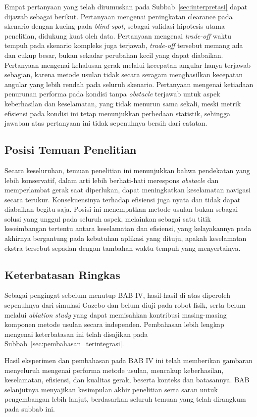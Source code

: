 Empat pertanyaan yang telah dirumuskan pada Subbab~\ref{sec:interpretasi}
dapat dijawab sebagai berikut. Pertanyaan mengenai peningkatan clearance
pada skenario dengan kucing pada \textit{blind-spot}, sebagai validasi
hipotesis utama penelitian, didukung kuat oleh data. Pertanyaan mengenai
\textit{trade-off} waktu tempuh pada skenario kompleks juga terjawab,
\textit{trade-off} tersebut memang ada dan cukup besar, bukan sekadar
perubahan kecil yang dapat diabaikan. Pertanyaan mengenai kehalusan gerak
melalui kecepatan angular hanya terjawab sebagian, karena metode usulan
tidak secara seragam menghasilkan kecepatan angular yang lebih rendah pada
seluruh skenario. Pertanyaan mengenai ketiadaan penurunan performa pada
kondisi tanpa \textit{obstacle} terjawab untuk aspek keberhasilan dan
keselamatan, yang tidak menurun sama sekali, meski metrik efisiensi pada
kondisi ini tetap menunjukkan perbedaan statistik, sehingga jawaban atas
pertanyaan ini tidak sepenuhnya bersih dari catatan.

\subsection{Posisi Temuan Penelitian}

Secara keseluruhan, temuan penelitian ini menunjukkan bahwa pendekatan yang
lebih konservatif, dalam arti lebih berhati-hati merespons \textit{obstacle}
dan memperlambat gerak saat diperlukan, dapat meningkatkan keselamatan
navigasi secara terukur. Konsekuensinya terhadap efisiensi juga nyata dan
tidak dapat diabaikan begitu saja. Posisi ini menempatkan metode usulan
bukan sebagai solusi yang unggul pada seluruh aspek, melainkan sebagai
satu titik keseimbangan tertentu antara keselamatan dan efisiensi, yang
kelayakannya pada akhirnya bergantung pada kebutuhan aplikasi yang dituju,
apakah keselamatan ekstra tersebut sepadan dengan tambahan waktu tempuh
yang menyertainya.

\subsection{Keterbatasan Ringkas}

Sebagai pengingat sebelum menutup BAB IV, hasil-hasil di atas diperoleh
sepenuhnya dari simulasi Gazebo dan belum diuji pada robot fisik, serta
belum melalui \textit{ablation study} yang dapat memisahkan kontribusi
masing-masing komponen metode usulan secara independen. Pembahasan lebih
lengkap mengenai keterbatasan ini telah disajikan pada
Subbab~\ref{sec:pembahasan_terintegrasi}.

Hasil eksperimen dan pembahasan pada BAB IV ini telah memberikan gambaran
menyeluruh mengenai performa metode usulan, mencakup keberhasilan,
keselamatan, efisiensi, dan kualitas gerak, beserta konteks dan batasannya.
BAB selanjutnya menyajikan kesimpulan akhir penelitian serta saran untuk
pengembangan lebih lanjut, berdasarkan seluruh temuan yang telah dirangkum
pada subbab ini.